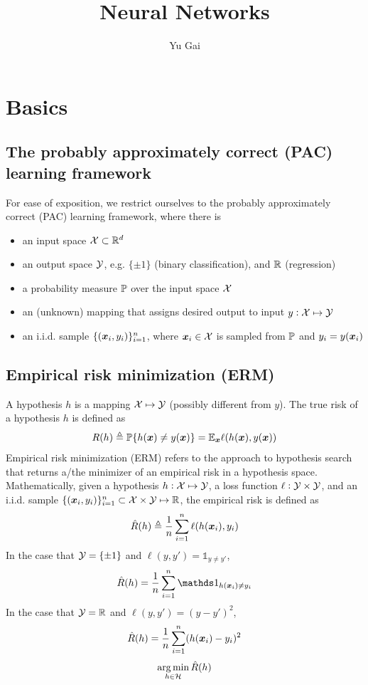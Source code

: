 \documentclass{article}
\title{Neural Networks}
\author{Yu Gai}
\DeclareMathOperator*{\argmin}{arg\,min}
\newcommand{\ind}{{\mathds 1}}
\begin{document}
\maketitle

\tableofcontents

\newpage

\section{Basics}

\subsection{The probably approximately correct (PAC) learning framework}

For ease of exposition, we restrict ourselves to the probably approximately correct (PAC) learning framework, where there is
\begin{itemize}
\item an input space ${\mathcal X} \subset {\mathbb R}^d$
\item an output space ${\mathcal Y}$, e.g. $\{\pm 1\}$ (binary classification), and ${\mathbb R}$ (regression)
\item a probability measure ${\mathbb P}$ over the input space ${\mathcal X}$
\item an (unknown) mapping that assigns desired output to input $y: {\mathcal X} \mapsto {\mathcal Y}$
\item an i.i.d. sample $\{({\bm x}_i, y_i)\}_{i = 1}^n$, where ${\bm x}_i \in {\mathcal X}$ is sampled from ${\mathbb P}$ and $y_i = y({\bm x}_i)$
\end{itemize}

\subsection{Empirical risk minimization (ERM)}

A hypothesis $h$ is a mapping ${\mathcal X} \mapsto {\mathcal Y}$ (possibly different from $y$).
The true risk of a hypothesis $h$ is defined as
\[
R(h)
\triangleq {\mathbb P} \{h({\bm x}) \ne y({\bm x})\}
= {\mathbb E}_{\bm x} \ell (h({\bm x}), y({\bm x}))
\]
Empirical risk minimization (ERM) refers to the approach to hypothesis search that returns a/the minimizer of an empirical risk in a hypothesis space.
Mathematically, given a hypothesis $h: {\mathcal X} \mapsto {\mathcal Y}$, a loss function $\ell: {\mathcal Y} \times {\mathcal Y}$, and an i.i.d. sample $\{({\bm x}_i, y_i)\}_{i = 1}^n \subset {\mathcal X} \times {\mathcal Y} \mapsto {\mathbb R}$, the empirical risk is defined as
\[
\hat{R} (h) \triangleq \frac1n \sum_{i = 1}^n \ell (h({\bm x}_i), y_i)
\]
In the case that ${\mathcal Y} = \{\pm 1\}$ and $\ell (y, y') = \ind_{y \ne y'}$,
\[
\hat{R} (h) = \frac1n \sum_{i = 1}^n \ind_{h(\bmx_i) \ne y_i}
\]
In the case that ${\mathcal Y} = {\mathbb R}$ and $\ell (y, y') = (y - y')^2$,
\[
\hat{R} (h) = \frac1n \sum_{i = 1}^n (h({\bm x}_i) - y_i)^2
\]
\[
\argmin_{h \in \calh} \hat{R} (h)
\]
\end{document}
